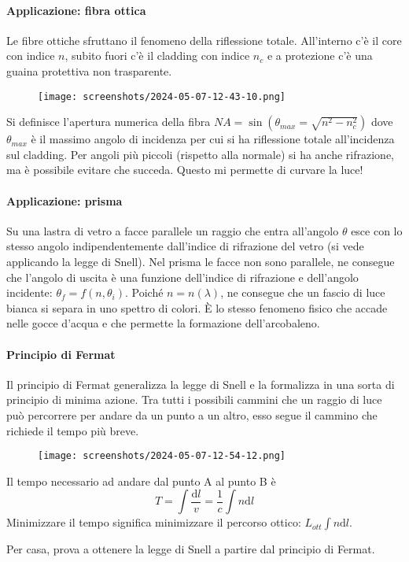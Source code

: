 \paragraph{Applicazione: fibra ottica}
Le fibre ottiche sfruttano il fenomeno della riflessione totale. All'interno c'è il core con indice \(n\), subito fuori c'è il cladding con indice \(n_c\) e a protezione c'è una guaina protettiva non trasparente.
\begin{figure}[H]
	\centering
	\texttt{[image: screenshots/2024-05-07-12-43-10.png]}
\end{figure}
Si definisce l'apertura numerica della fibra \(NA=\sin (\theta_{max} = \sqrt{n^{2} -n_c ^{2} } )\) dove \(\theta_{max} \) è il massimo angolo di incidenza per cui si ha riflessione totale all'incidenza sul cladding. Per angoli più piccoli (rispetto alla normale) si ha anche rifrazione, ma è possibile evitare che succeda. Questo mi permette di curvare la luce!

\paragraph{Applicazione: prisma}
Su una lastra di vetro a facce parallele un raggio che entra all'angolo \(\theta \) esce con lo stesso angolo indipendentemente dall'indice di rifrazione del vetro (si vede applicando la legge di Snell). Nel prisma le facce non sono parallele, ne consegue che l'angolo di uscita è una funzione dell'indice di rifrazione e dell'angolo incidente: \(\theta_f = f(n, \theta _i)\). Poiché \(n =n(\lambda )\), ne consegue che un fascio di luce bianca si separa in uno spettro di colori. È lo stesso fenomeno fisico che accade nelle gocce d'acqua e che permette la formazione dell'arcobaleno.

\paragraph{Principio di Fermat}
Il principio di Fermat generalizza la legge di Snell e la formalizza in una sorta di principio di minima azione. Tra tutti i possibili cammini che un raggio di luce può percorrere per andare da un punto a un altro, esso segue il cammino che richiede il tempo più breve.
\begin{figure}[H]
	\centering
	\texttt{[image: screenshots/2024-05-07-12-54-12.png]}
\end{figure}
Il tempo necessario ad andare dal punto A al punto B è
\begin{equation}
	T = \int \frac{\mathrm{d} l}{v} = \frac{1}{c} \int n \mathrm{d} l
\end{equation}
Minimizzare il tempo significa minimizzare il percorso ottico: \(L_{ott}  \int n \mathrm{d} l\).

\begin{exercise}
	Per casa, prova a ottenere la legge di Snell a partire dal principio di Fermat.
\end{exercise}